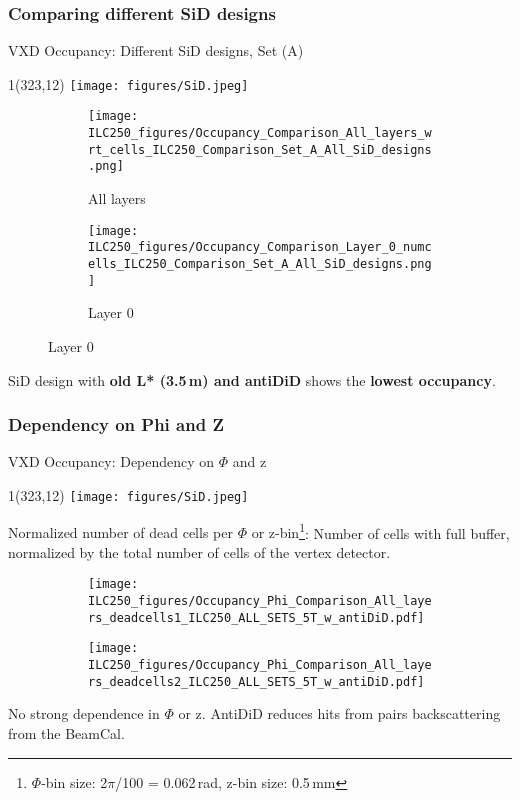 \documentclass[xcolor={dvipsnames}]{beamer}
\newcommand{\sidlogo}{
  \setlength{\TPHorizModule}{1pt}
  \setlength{\TPVertModule}{1pt}
  \begin{textblock}{1}(323,12)
   \texttt{[image: figures/SiD.jpeg]}
  \end{textblock}
  }
\begin{document}
\subsubsection{Comparing different SiD designs}
\begin{frame}{VXD Occupancy: Different SiD designs, Set (A)}
\sidlogo

\begin{figure}
\centering
\begin{subfigure}[t]{0.48\textwidth}
\centering
\texttt{[image: ILC250\_figures/Occupancy\_Comparison\_All\_layers\_wrt\_cells\_ILC250\_Comparison\_Set\_A\_All\_SiD\_designs.png]}
\caption{\alert{All layers}}
 \end{subfigure}
\hspace*{0.2cm}
\begin{subfigure}[t]{0.48\textwidth}
\centering
\texttt{[image: ILC250\_figures/Occupancy\_Comparison\_Layer\_0\_numcells\_ILC250\_Comparison\_Set\_A\_All\_SiD\_designs.png]}
\caption{\alert{Layer 0}}
\end{subfigure}
\end{figure}
\normalsize SiD design with \textbf{old L* (3.5\,m) and antiDiD} shows the \textbf{lowest occupancy}.
\end{frame}

\subsubsection{Dependency on Phi and Z}
\begin{frame}{VXD Occupancy: Dependency on $\Phi$ and z}
\sidlogo
\alert{Normalized number of dead cells per $\Phi$ or z-bin}\footnote{$\Phi$-bin size: 2$\pi$/100 = 0.062\,rad, z-bin size: 0.5\,mm}: Number of cells with full buffer, normalized by the total number of cells of the vertex detector.
\begin{figure}
\centering
\begin{subfigure}[t]{0.48\textwidth}
\centering
\texttt{[image: ILC250\_figures/Occupancy\_Phi\_Comparison\_All\_layers\_deadcells1\_ILC250\_ALL\_SETS\_5T\_w\_antiDiD.pdf]}
 \end{subfigure}
\hspace*{0.2cm}
\begin{subfigure}[t]{0.48\textwidth}
\centering
\texttt{[image: ILC250\_figures/Occupancy\_Phi\_Comparison\_All\_layers\_deadcells2\_ILC250\_ALL\_SETS\_5T\_w\_antiDiD.pdf]}
\end{subfigure}
\end{figure}
No strong dependence in $\Phi$ or z. AntiDiD reduces hits from pairs backscattering from the BeamCal.
\end{frame}
\end{document}
